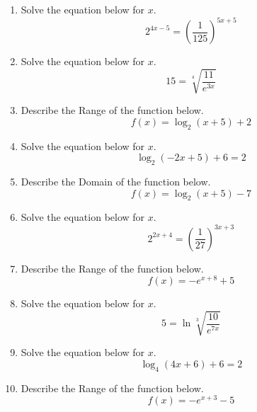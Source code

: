 \documentclass[14pt]{extbook}
\begin{document}
\begin{enumerate}
\item{
Solve the equation below for $x$.\[ 2^{4x-5} = \left(\frac{1}{125}\right)^{5x+5} \]} \newpage
\item{
Solve the equation below for $x$.\[  15 = \sqrt[4]{\frac{11}{e^{3x}}} \]} \newpage
\item{
Describe the Range of the function below.\[ f(x) = \log_2{(x+5)}+2 \]} \newpage
\item{
Solve the equation below for $x$.\[ \log_{2}{(-2x+5)}+6 = 2 \]} \newpage
\item{
Describe the Domain of the function below.\[ f(x) = \log_2{(x+5)}-7 \]} \newpage
\item{
Solve the equation below for $x$.\[ 2^{2x+4} = \left(\frac{1}{27}\right)^{3x+3} \]} \newpage
\item{
Describe the Range of the function below.\[ f(x) = -e^{x+8}+5 \]} \newpage
\item{
Solve the equation below for $x$.\[  5 = \ln{\sqrt[3]{\frac{10}{e^{7x}}}} \]} \newpage
\item{
Solve the equation below for $x$.\[ \log_{4}{(4x+6)}+6 = 2 \]} \newpage
\item{
Describe the Range of the function below.\[ f(x) = -e^{x+3}-5 \]} \newpage
\end{enumerate}
\end{document}
